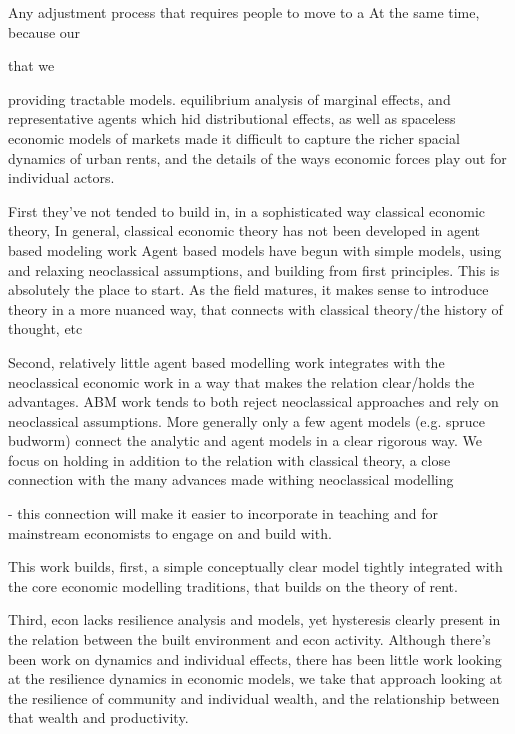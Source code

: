 Any adjustment process that requires people to move to a 
At the same time, because our  

that we 

providing tractable models.  equilibrium analysis of marginal effects, and representative agents which hid distributional effects, as well as spaceless economic models of markets made it difficult to capture the richer spacial dynamics of urban rents, and the details of the ways economic forces play out for individual actors.

First they've not tended to build in, in a sophisticated way classical economic theory,
In general, classical economic theory has not been developed in agent based modeling work
Agent based models have begun with simple models, using and relaxing neoclassical assumptions, and building from first principles. This is absolutely the place to start. As the field matures, it makes sense to introduce theory in a more nuanced way, that connects with classical theory/the history of thought, etc

Second, relatively little agent based modelling work integrates with the neoclassical economic work in a way that makes the relation clear/holds the advantages. ABM work tends to both reject neoclassical approaches and rely on neoclassical assumptions.
More generally only a few agent models (e.g. spruce budworm) connect the analytic and agent models in a clear rigorous way. We focus on holding in addition to the relation with classical theory, a close connection with the many advances made withing neoclassical modelling

- this connection will make it easier to incorporate in teaching and for mainstream economists to engage on and build with.


This work builds, first, a simple conceptually clear model tightly integrated with the core economic modelling traditions, that builds on the theory of rent.


Third, econ lacks resilience analysis and models, yet hysteresis clearly present in the relation between the built environment and econ activity. Although there's been work on dynamics and individual effects, there has been little work looking at the resilience dynamics in economic models, we take that approach looking at the resilience of community and individual wealth, and the relationship between that wealth and productivity. 

